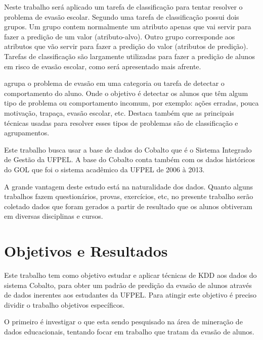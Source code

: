 \documentclass[diss-proposta,nocipinfo]{texufpel}
\begin{document}
Neste trabalho será aplicado um tarefa de classificação para tentar resolver o problema de evasão escolar. 
Segundo \citet{goldschmidt2015data} uma tarefa de classificação possui dois grupos. Um grupo contem normalmente um atributo apenas que vai servir para fazer a predição de um valor (atributo-alvo). Outro grupo corresponde aos atributos que vão servir para fazer a predição do valor (atributos de predição).
Tarefas de classificação são largamente utilizadas para fazer a predição de alunos em risco de evasão escolar, como será apresentado mais afrente.

\citet{baker2010data} agrupa o problema de evasão em uma categoria ou tarefa de detectar o comportamento do aluno.
Onde o objetivo é detectar os alunos que têm algum tipo de problema ou comportamento incomum, por exemplo: ações erradas, pouca motivação, trapaça, evasão escolar, etc.
Destaca também que as principais técnicas usadas para resolver esses tipos de problemas são de classificação e agrupamentos.

Este trabalho busca usar a base de dados do Cobalto que é o Sistema Integrado de Gestão da UFPEL. A base do Cobalto conta também com os dados históricos do GOL que foi o sistema acadêmico da UFPEL de 2006 à 2013. %

A grande vantagem deste estudo está na naturalidade dos dados. Quanto alguns trabalhos fazem questionários, provas, exercícios, etc, no presente trabalho serão coletado dados que foram gerados a partir de resultado que os alunos obtiveram em diversas disciplinas e cursos.




\chapter{Objetivos e Resultados}

Este trabalho tem como objetivo estudar e aplicar técnicas de KDD aos dados do sistema Cobalto, para obter um padrão de predição da evasão de alunos através de dados inerentes aos estudantes da UFPEL. Para atingir este objetivo é preciso dividir o trabalho objetivos específicos.

O primeiro é investigar o que esta sendo pesquisado na área de mineração de dados educacionais, tentando focar em trabalho que tratam da evasão de alunos.
\end{document}
